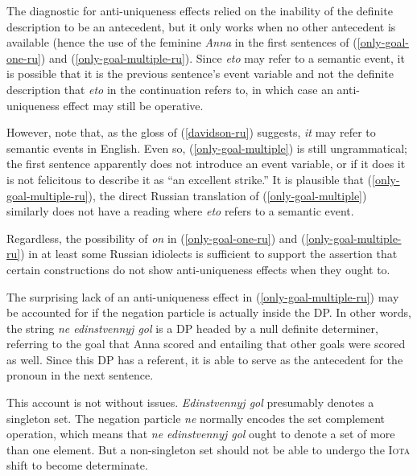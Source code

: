 \documentclass{article}
\begin{document}
The diagnostic for anti-uniqueness effects relied on the inability of the definite description to be an antecedent, but it only works when no other antecedent is available (hence the use of the feminine \textit{Anna} in the first sentences of (\ref{only-goal-one-ru}) and (\ref{only-goal-multiple-ru}). Since \textit{eto} may refer to a semantic event, it is possible that it is the previous sentence's event variable and not the definite description that \textit{eto} in the continuation refers to, in which case an anti-uniqueness effect may still be operative.

However, note that, as the gloss of (\ref{davidson-ru}) suggests, \textit{it} may refer to semantic events in English. Even so, (\ref{only-goal-multiple}) is still ungrammatical; the first sentence apparently does not introduce an event variable, or if it does it is not felicitous to describe it as ``an excellent strike.'' It is plausible that (\ref{only-goal-multiple-ru}), the direct Russian translation of (\ref{only-goal-multiple}) similarly does not have a reading where \textit{eto} refers to a semantic event.

Regardless, the possibility of \textit{on} in (\ref{only-goal-one-ru}) and (\ref{only-goal-multiple-ru}) in at least some Russian idiolects is sufficient to support the assertion that certain constructions do not show anti-uniqueness effects when they ought to.


The surprising lack of an anti-uniqueness effect in (\ref{only-goal-multiple-ru}) may be accounted for if the negation particle is actually inside the DP. In other words, the string \textit{ne edinstvennyj gol} is a DP headed by a null definite determiner, referring to the goal that Anna scored and entailing that other goals were scored as well. Since this DP has a referent, it is able to serve as the antecedent for the pronoun in the next sentence.

This account is not without issues. \textit{Edinstvennyj gol} presumably denotes a singleton set. The negation particle \textit{ne} normally encodes the set complement operation, which means that \textit{ne edinstvennyj gol} ought to denote a set of more than one element. But a non-singleton set should not be able to undergo the \textsc{Iota} shift to become determinate.
\end{document}
